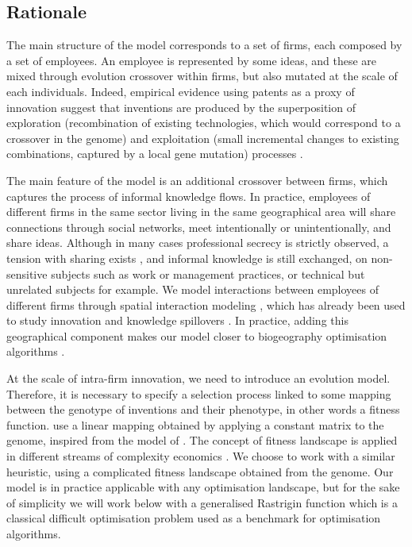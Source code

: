 \documentclass[letterpaper]{article}
\begin{document}
\subsection{Rationale}

The main structure of the model corresponds to a set of firms, each composed by a set of employees. An employee is represented by some ideas, and these are mixed through evolution crossover within firms, but also mutated at the scale of each individuals. Indeed, empirical evidence using patents as a proxy of innovation suggest that inventions are produced by the superposition of exploration (recombination of existing technologies, which would correspond to a crossover in the genome) and exploitation (small incremental changes to existing combinations, captured by a local gene mutation) processes \citep{youn2015invention}. 

The main feature of the model is an additional crossover between firms, which captures the process of informal knowledge flows. In practice, employees of different firms in the same sector living in the same geographical area will share connections through social networks, meet intentionally or unintentionally, and share ideas. Although in many cases professional secrecy is strictly observed, a tension with sharing exists \citep{rouyre2019managing}, and informal knowledge is still exchanged, on non-sensitive subjects such as work or management practices, or technical but unrelated subjects for example. We model interactions between employees of different firms through spatial interaction modeling \citep{wilson1975some}, which has already been used to study innovation and knowledge spillovers \citep{lesage2007knowledge}. In practice, adding this geographical component makes our model closer to biogeography optimisation algorithms \citep{simon2008biogeography}.

At the scale of intra-firm innovation, we need to introduce an evolution model. Therefore, it is necessary to specify a selection process linked to some mapping between the genotype of inventions and their phenotype, in other words a fitness function. \cite{ma2005agent} use a linear mapping obtained by applying a constant matrix to the genome, inspired from the model of \cite{kauffman1995technological}. The concept of fitness landscape is applied in different streams of complexity economics \citep{khraisha2020complex}. We choose to work with a similar heuristic, using a complicated fitness landscape obtained from the genome. Our model is in practice applicable with any optimisation landscape, but for the sake of simplicity we will work below with a generalised Rastrigin function which is a classical difficult optimisation problem used as a benchmark for optimisation algorithms.
\end{document}
